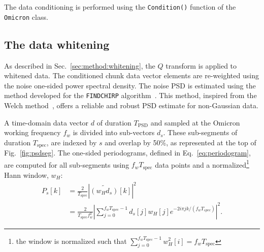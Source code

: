 The data conditioning is performed using the \texttt{Condition()} function of the \texttt{Omicron} class.


\subsection{The data whitening} \label{sec:algorithm:whitening}

As described in Sec.~\ref{sec:method:whitening}, the $Q$ transform is applied to whitened data. The conditioned chunk data vector elements are re-weighted using the noise one-sided power spectral density. The noise PSD is estimated using the method developed for the \texttt{FINDCHIRP} algorithm~\cite{Allen:2005fk}. This method, inspired from the Welch method~\cite{Welch:1967}, offers a reliable and robust PSD estimate for non-Gaussian data.

A time-domain data vector $d$ of duration $T_\mathrm{PSD}$ and sampled at the Omicron working frequency $f_w$ is divided into sub-vectors $d_s$. These sub-segments of duration $T_\mathrm{spec}$, are indexed by $s$ and overlap by 50\%, as represented at the top of Fig.~\ref{fig:psdseg}. The one-sided periodograms, defined in Eq.~\ref{eq:periodogram}, are computed for all sub-segments using $f_wT_\mathrm{spec}$ data points and a normalized\footnote{the window is normalized such that $\sum_{j=0}^{f_wT_\mathrm{spec}-1}{w_H^2[i]} = f_wT_\mathrm{spec}$} Hann window, $w_H$:
\begin{align}
  P_s[k] &= \frac{2}{T_\mathrm{spec}}\left|\widetilde{(w_Hd_s)}[k]\right|^2 \\
  &= \frac{2}{T_\mathrm{spec}f_w^2}\left|\sum_{j=0}^{f_wT_\mathrm{spec}-1}{d_s[j]w_H[j]e^{-2i\pi jk/(f_wT_{spec})}}\right|^2.
\end{align}

